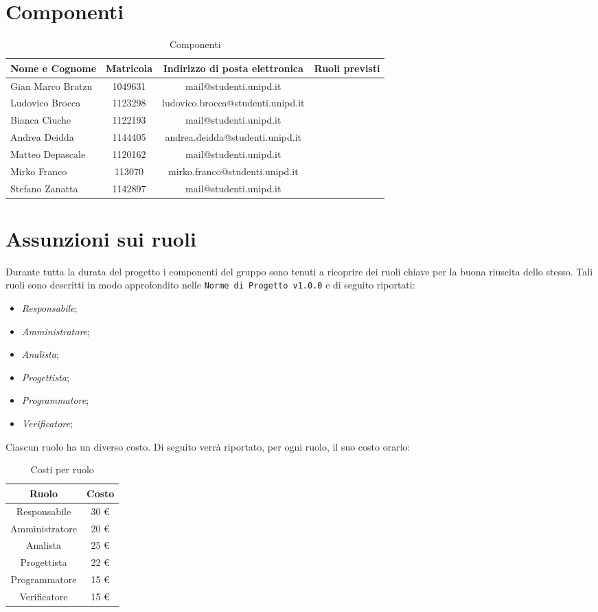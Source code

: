 \section{Componenti}
	\begin{table}[htp]
		\centering
		\caption{Componenti}
		\begin{tabularx}{\textwidth}{|X|c|c|X|}
			\hline
			\textbf{Nome e Cognome} & \textbf{Matricola} & \textbf{Indirizzo di posta elettronica} & \textbf{Ruoli previsti} \\
			\hline 
			Gian Marco Bratzu & 1049631 & mail@studenti.unipd.it & \\
			Ludovico Brocca & 1123298 & ludovico.brocca@studenti.unipd.it & \\
			Bianca Ciuche & 1122193 & mail@studenti.unipd.it & \\
			Andrea Deidda & 1144405 & andrea.deidda@studenti.unipd.it & \\
			Matteo Depascale & 1120162 & mail@studenti.unipd.it & \\
			Mirko Franco & 113070 &  mirko.franco@studenti.unipd.it & \\
			Stefano Zanatta & 1142897 & mail@studenti.unipd.it & \\
			\hline
		\end{tabularx}
	\end{table}
\section{Assunzioni sui ruoli}
	Durante tutta la durata del progetto i componenti del gruppo sono tenuti a ricoprire dei ruoli chiave per la buona riuscita dello stesso.
	Tali ruoli sono descritti in modo approfondito nelle \texttt{Norme di Progetto v1.0.0} e di seguito riportati:
	\begin{itemize}
		\item 	\textit{Responsabile};
		\item \textit{Amministratore};
		\item \textit{Analista};
		\item \textit{Progettista};
		\item \textit{Programmatore};
		\item \textit{Verificatore};
	\end{itemize}
	Ciascun ruolo ha un diverso costo. Di seguito verrà riportato, per ogni ruolo, il suo costo orario:
	\begin{table}[htp]
		\centering
		\caption{Costi per ruolo}
		\begin{tabular}{|c|c|}
			\hline
			\textbf{Ruolo} & \textbf{Costo} \\
			\hline
			Responsabile & 30 \euro \\
			Amministratore & 20 \euro \\
			Analista & 25 \euro \\
			Progettista & 22 \euro \\
			Programmatore & 15 \euro \\
			Verificatore & 15 \euro \\
			\hline
		\end{tabular}
	\end{table}